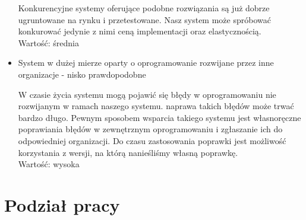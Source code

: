 \documentclass[../praca-dyplomowa.tex]{subfiles}
\begin{document}
\begin{itemize}
          Konkurencyjne systemy oferujące podobne rozwiązania są już dobrze ugruntowane na rynku i przetestowane. Nasz system może spróbować konkurować jedynie z nimi ceną implementacji oraz elastycznością.\\
          Wartość: średnia
    \item System w dużej mierze oparty o oprogramowanie rozwijane przez inne organizacje - nisko prawdopodobne

          W czasie życia systemu mogą pojawić się błędy w oprogramowaniu nie rozwijanym w ramach naszego systemu. naprawa takich błędów może trwać bardzo długo. Pewnym sposobem wsparcia takiego systemu jest własnoręczne poprawiania błędów w zewnętrznym oprogramowaniu i zgłaszanie ich do odpowiedniej organizacji. Do czasu zastosowania poprawki jest możliwość korzystania z wersji, na którą nanieśliśmy własną poprawkę.\\
          Wartość: wysoka

\end{itemize}

\section{Podział pracy}

\end{document}
